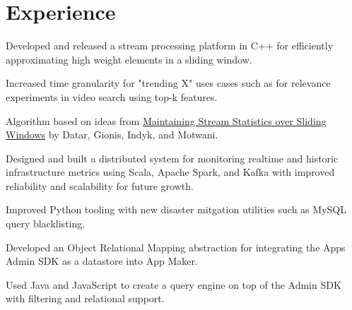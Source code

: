 \documentclass[]{resume}
\begin{document}
\begin{minipage}[t]{0.66\textwidth}


\section{Experience}

\vspace{\topsep} %
\begin{tightemize}
\item Developed and released a stream processing platform in C++ for efficiently
approximating high weight elements in a sliding window.
\item Increased time granularity for "trending X" uses cases such as for relevance
experiments in video search using top-k features.
\item Algorithm based on ideas from
\href{http://www-cs-students.stanford.edu/~datar/papers/sicomp_streams.pdf}
{Maintaining Stream Statistics over Sliding Windows} by Datar, Gionis, Indyk, and Motwani.
\end{tightemize}
\sectionsep

\begin{tightemize}
\item Designed and built a distributed system for monitoring realtime and historic
infrastructure metrics using Scala, Apache Spark, and Kafka with improved reliability
and scalability for future growth.
\item Improved Python tooling with new disaster mitgation utilities such as MySQL query
blacklisting.
\end{tightemize}
\sectionsep

\begin{tightemize}
\item Developed an Object Relational Mapping abstraction for integrating the Apps
Admin SDK as a datastore into App Maker.
\item Used Java and JavaScript to create a query engine on top of the Admin SDK with
filtering and relational support.
\end{tightemize}
\sectionsep


\end{minipage}
\end{document}
